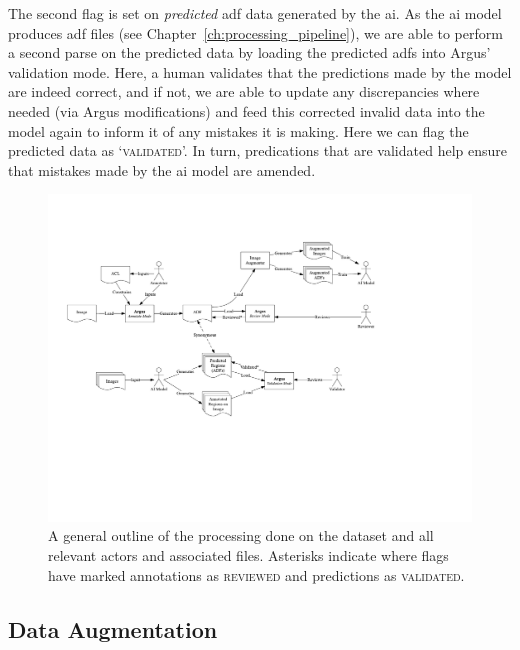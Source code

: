 The second flag is set on \textit{predicted} \gls{adf} data generated by the \gls{ai}. As the \gls{ai} model produces \gls{adf} files (see Chapter~\ref{ch:processing_pipeline}), we are able to perform a second parse on the predicted data by loading the predicted \glspl{adf} into Argus' validation mode. Here, a human validates that the predictions made by the model are indeed correct, and if not, we are able to update any discrepancies where needed (via Argus modifications) and feed this corrected invalid data into the model again to inform it of any mistakes it is making. Here we can flag the predicted data as `\textsc{validated}'. In turn, predications that are validated help ensure that mistakes made by the \gls{ai} model are amended. 


\begin{landscape}
\begin{figure}[p]
  \centering
  \includegraphics[width=1.1\paperwidth]{images/dataset/overview}
  \caption[Overview of processing made on our dataset]{A general outline of the processing done on the dataset and all relevant actors and associated files. Asterisks indicate where flags have marked annotations as \textsc{reviewed} and predictions as \textsc{validated}.}
  \label{fig:dataset:postprocessing:overal_data_processing}
\end{figure}
\end{landscape}

\subsection{Data Augmentation}
\label{sec:dataset:postprocessing:augmentation}

